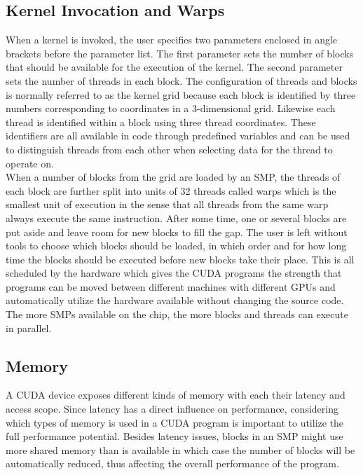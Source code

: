 \subsection{Kernel Invocation and Warps}
\label{sec:kernelandwarps}
When a kernel is invoked, the user specifies two parameters enclosed in angle brackets before the parameter list. The first parameter sets the number of blocks that should be available for the execution of the kernel. The second parameter sets the number of threads in each block. The configuration of threads and blocks is normally referred to as the kernel grid because each block is identified by three numbers corresponding to coordinates in a 3-dimensional grid. Likewise each thread is identified within a block using three thread coordinates. These identifiers are all available in code through predefined variables and can be used to distinguish threads from each other when selecting data for the thread to operate on.\\

When a number of blocks from the grid are loaded by an SMP, the threads of each block are further split into units of 32 threads called warps which is the smallest unit of execution in the sense that all threads from the same warp always execute the same instruction. After some time, one or several blocks are put aside and leave room for new blocks to fill the gap. The user is left without tools to choose which blocks should be loaded, in which order and for how long time the blocks should be executed before new blocks take their place. This is all scheduled by the hardware which gives the CUDA programs the strength that programs can be moved between different machines with different GPUs and automatically utilize the hardware available without changing the source code. The more SMPs available on the chip, the more blocks and threads can execute in parallel.

\subsection{Memory}
A CUDA device exposes different kinds of memory with each their latency and access scope. Since latency has a direct influence on performance, considering which types of memory is used in a CUDA program is important to utilize the full performance potential. Besides latency issues, blocks in an SMP might use more shared memory than is available in which case the number of blocks will be automatically reduced, thus affecting the overall performance of the program. \\

